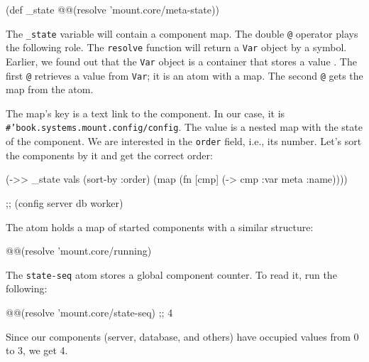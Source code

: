 \else

\begin{english}
  \begin{clojure}
(def _state @@(resolve 'mount.core/meta-state))
  \end{clojure}
\end{english}

\fi


The \verb|_state| variable will contain a component map. The double \verb|@| operator plays the following role. The \verb|resolve| function will return a \verb|Var| object by a symbol. Earlier, we found out that the \verb|Var| object is a container that stores a value . The first \verb|@| retrieves a value from \verb|Var|; it is an atom with a map. The second \verb|@| gets the map from the atom.


The map's key is a text link to the component. In our case, it is \texttt{\#'book.systems.mount\-.config/config}. The value is a nested map with the state of the component. We are interested in the \verb|order| field, i.e., its number. Let's sort the components by it and get the correct order:

\begin{english}
  \begin{clojure}
(->> _state
     vals (sort-by :order)
     (map (fn [cmp]
            (-> cmp :var meta :name))))

;; (config server db worker)
  \end{clojure}
\end{english}

The  atom holds a map of started components with a similar structure:

\begin{english}
  \begin{clojure}
@@(resolve 'mount.core/running)
  \end{clojure}
\end{english}

The \verb|state-seq| atom stores a global component counter. To read it, run the following:

\begin{english}
  \begin{clojure}
@@(resolve 'mount.core/state-seq) ;; 4
  \end{clojure}
\end{english}

\noindent
Since our components (server, database, and others) have occupied values from 0 to 3, we get 4.

